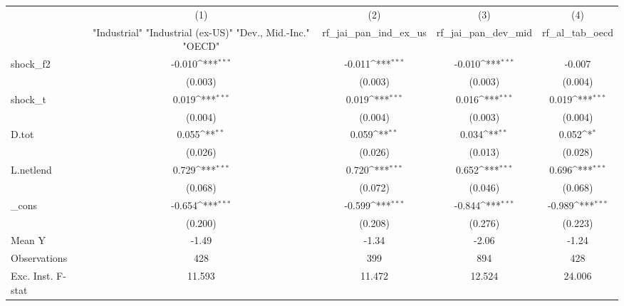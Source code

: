 {
\def\sym#1{\ifmmode^{#1}\else\(^{#1}\)\fi}
\begin{tabular}{l*{4}{c}}
\toprule
            &\multicolumn{1}{c}{(1)}&\multicolumn{1}{c}{(2)}&\multicolumn{1}{c}{(3)}&\multicolumn{1}{c}{(4)}\\
            &\multicolumn{1}{c}{ "Industrial" "Industrial (ex-US)" "Dev., Mid.-Inc." "OECD" }&\multicolumn{1}{c}{rf\_jai\_pan\_ind\_ex\_us}&\multicolumn{1}{c}{rf\_jai\_pan\_dev\_mid}&\multicolumn{1}{c}{rf\_al\_tab\_oecd}\\
\midrule
shock\_f2    &      -0.010\sym{***}&      -0.011\sym{***}&      -0.010\sym{***}&      -0.007         \\
            &     (0.003)         &     (0.003)         &     (0.003)         &     (0.004)         \\
\addlinespace
shock\_t     &       0.019\sym{***}&       0.019\sym{***}&       0.016\sym{***}&       0.019\sym{***}\\
            &     (0.004)         &     (0.004)         &     (0.003)         &     (0.004)         \\
\addlinespace
D.tot       &       0.055\sym{**} &       0.059\sym{**} &       0.034\sym{**} &       0.052\sym{*}  \\
            &     (0.026)         &     (0.026)         &     (0.013)         &     (0.028)         \\
\addlinespace
L.netlend   &       0.729\sym{***}&       0.720\sym{***}&       0.652\sym{***}&       0.696\sym{***}\\
            &     (0.068)         &     (0.072)         &     (0.046)         &     (0.068)         \\
\addlinespace
\_cons      &      -0.654\sym{***}&      -0.599\sym{***}&      -0.844\sym{***}&      -0.989\sym{***}\\
            &     (0.200)         &     (0.208)         &     (0.276)         &     (0.223)         \\
\midrule
Mean Y      &       -1.49         &       -1.34         &       -2.06         &       -1.24         \\
Observations&         428         &         399         &         894         &         428         \\
Exc. Inst. F-stat&      11.593         &      11.472         &      12.524         &      24.006         \\
\bottomrule
\end{tabular}
}
